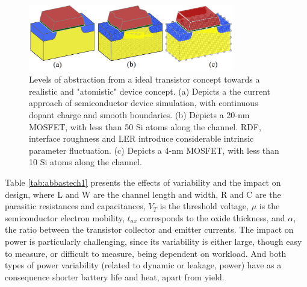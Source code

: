 \documentclass[diss,pgmicro,english]{iiufrgs}
\begin{document}
    \begin{figure} []
        \centering
        \includegraphics[width=0.8\textwidth, trim={0 0 0 0},clip]{transistorVariability.png}
        \caption{Levels of abstraction from a ideal transistor concept towards a realistic and "atomistic" device concept. (a) Depicts a the current approach of semiconductor device simulation, with continuous dopant charge and smooth boundaries. (b) Depicts a 20-nm MOSFET, with less than 50 Si atoms along the channel. RDF, interface roughness and LER introduce considerable intrinsic parameter fluctuation. (c) Depicts a 4-nm MOSFET, with less than 10 Si atoms along the channel. }
        \label{fig:transAbs}
    \end{figure}

\begin{table}[]
\centering
\caption{Impact of variability on performance and power.}
\label{tab:abbastech1}
\end{table}

Table \ref{tab:abbastech1} presents the effects of variability and the impact on design, where L and W are the channel length and  width, R and C are the parasitic resistances and capacitances, $V_{T}$ is the threshold voltage, $\mu$ is the semiconductor electron mobility, $t_{ox}$ corresponds to the oxide thickness, and $\alpha$, the ratio between the transistor collector and emitter currents. The impact on power is particularly challenging, since its variability is either large, though easy to measure, or difficult to measure, being dependent on workload. And both types of power variability (related to dynamic or leakage, power) have as a consequence shorter battery life and heat, apart from yield.
\end{document}
